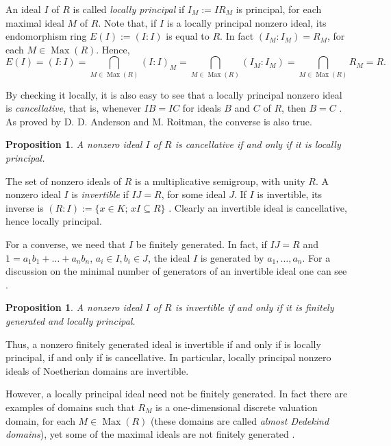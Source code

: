 \documentclass[12pt]{amsart}
\newtheorem{proposition}[theorem]{Proposition}
\theoremstyle{definition}
\begin{document}
 
An ideal $I$ of $R$ is called \emph{locally principal} if $I_M:=IR_M$ is principal, for each maximal ideal $M$ of $R$. Note that, if $I$ is a locally principal nonzero ideal, its endomorphism ring $E(I):=(I:I)$ is equal to $R$. In fact $(I_M:I_M)=R_M$, for each $M\in \operatorname{Max}(R)$. Hence, 
$$E(I)=(I:I)=\bigcap_{M\in \operatorname{Max}(R)} (I:I)_M=\bigcap_{M\in \operatorname{Max}(R)} (I_M:I_M)= \bigcap_{M\in \operatorname{Max}(R)} R_M =R.$$

  By checking it locally, it is also easy to see that a locally principal nonzero  ideal is  \emph{cancellative}, that is, whenever $IB = IC$ for ideals $B$ and $C$ of $R$, then $B = C$ \cite[Section 6]{gilmer}. 
  As proved by D. D. Anderson and M. Roitman, the converse is also true. 
  
 \begin{proposition} \cite[Theorem]{AR} A nonzero ideal $I$ of $R$ is cancellative if and only if it is locally principal. \end{proposition} 
 
 The set of nonzero ideals of $R$ is a multiplicative semigroup,  with unity $R$.  A nonzero ideal $I$ is \emph{invertible} if $IJ=R$, for some ideal $J$. If $I$ is invertible, its inverse is $(R:I):=\{x\in K; \,xI{\subseteq} R\}$ \cite[Section 7]{gilmer}.  
Clearly an invertible ideal is cancellative, hence locally principal. 

For a converse, we need that $I$ be finitely generated.
In fact, if $IJ=R$ and $1=a_1b_1+ \dots + a_nb_n$, $a_i\in I, b_i\in J$, the ideal $I$ is generated by $a_1, \dots, a_n$. For a discussion on the minimal number of generators of an invertible ideal one can see \cite{OR}.

\begin{proposition} \cite[Corollary 7.5]{gilmer} \label{inv} A nonzero ideal $I$ of $R$ is invertible if and only if it is finitely generated and locally principal.
\end{proposition} 

Thus, a nonzero finitely generated  ideal is invertible if and only if is locally principal, if and only if is cancellative. In particular, locally principal nonzero  ideals of Noetherian domains are invertible.

However, a locally principal ideal need not be finitely generated. In fact there are examples of domains such that $R_M$ is a one-dimensional  discrete valuation domain, for each $M\in \operatorname{Max}(R)$ (these domains are called \emph{almost Dedekind domains}), yet some of the maximal ideals are not finitely generated \cite[Section 36]{gilmer}. 
\end{document}

